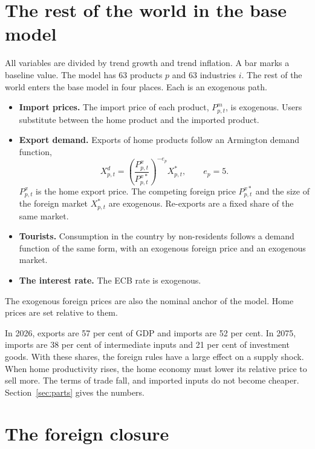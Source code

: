 \documentclass[11pt,a4paper]{article}
\begin{document}
\section{The rest of the world in the base model}
\label{sec:base}

All variables are divided by trend growth and trend inflation. A bar marks a baseline value. The model has 63 products $p$ and 63 industries $i$.
The rest of the world enters the base model in four places. Each is an exogenous path.

\begin{itemize}
\item \textbf{Import prices.} The import price of each product, $P^{m}_{p,t}$, is exogenous. Users substitute between the home product and the imported product.
\item \textbf{Export demand.} Exports of home products follow an Armington demand function,
\begin{equation}
X^{d}_{p,t} = \left( \frac{P^{x}_{p,t}}{P^{x*}_{p,t}} \right)^{-e_p} X^{*}_{p,t} , \qquad e_p = 5 .
\label{eq:armington}
\end{equation}
$P^{x}_{p,t}$ is the home export price. The competing foreign price $P^{x*}_{p,t}$ and the size of the foreign market $X^{*}_{p,t}$ are exogenous. Re-exports are a fixed share of the same market.
\item \textbf{Tourists.} Consumption in the country by non-residents follows a demand function of the same form, with an exogenous foreign price and an exogenous market.
\item \textbf{The interest rate.} The ECB rate is exogenous.
\end{itemize}

The exogenous foreign prices are also the nominal anchor of the model. Home prices are set relative to them.

In 2026, exports are 57 per cent of GDP and imports are 52 per cent. In 2075, imports are 38 per cent of intermediate inputs and 21 per cent of investment goods.
With these shares, the foreign rules have a large effect on a supply shock. When home productivity rises, the home economy must lower its relative price to sell more. The terms of trade fall, and imported inputs do not become cheaper. Section~\ref{sec:parts} gives the numbers.

\section{The foreign closure}
\label{sec:closure}
\end{document}
